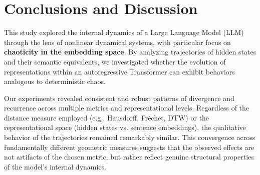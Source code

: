 \documentclass[a4paper,12pt]{article}
\begin{document}

\section{Conclusions and Discussion}
\label{sec:conclusions}



This study explored the internal dynamics of a Large Language Model (LLM) through the lens of nonlinear dynamical systems, with particular focus on \textbf{chaoticity in the embedding space}. By analyzing trajectories of hidden states and their semantic equivalents, we investigated whether the evolution of representations within an autoregressive Transformer can exhibit behaviors analogous to deterministic chaos.

Our experiments revealed consistent and robust patterns of divergence and recurrence across multiple metrics and representational levels. Regardless of the distance measure employed (e.g., Hausdorff, Fréchet, DTW) or the representational space (hidden states vs. sentence embeddings), the qualitative behavior of the trajectories remained remarkably similar. This convergence across fundamentally different geometric measures suggests that the observed effects are not artifacts of the chosen metric, but rather reflect genuine structural properties of the model’s internal dynamics.
\end{document}
